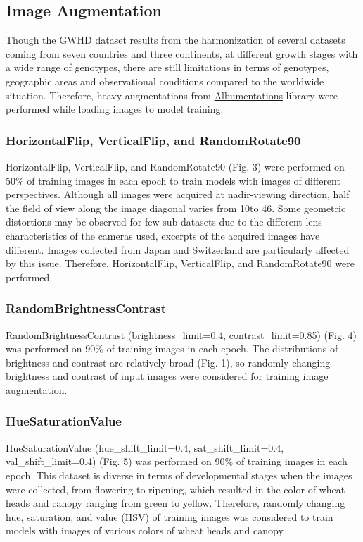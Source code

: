 \documentclass[utf8]{frontiersSCNS} %
\begin{document}
\subsection{Image Augmentation}
Though the GWHD dataset results from the harmonization of several datasets coming from seven countries and three continents, at different growth stages with a wide range of genotypes, there are still limitations in terms of genotypes, geographic areas and observational conditions compared to the worldwide situation. Therefore, heavy augmentations from \href{https://albumentations.ai}{Albumentations} library were performed while loading images to model training.

\subsubsection{HorizontalFlip, VerticalFlip, and RandomRotate90}
HorizontalFlip, VerticalFlip, and RandomRotate90 (Fig. 3) were performed on 50\% of training images in each epoch to train models with images of different perspectives. Although all images were acquired at nadir-viewing direction, half the field of view along the image diagonal varies from 10\degree \space to 46\degree. Some geometric distortions may be observed for few sub-datasets due to the different lens characteristics of the cameras used, excerpts of the acquired images have different. Images collected from Japan and Switzerland are particularly affected by this issue. Therefore, HorizontalFlip, VerticalFlip, and RandomRotate90 were performed.

\subsubsection{RandomBrightnessContrast}
RandomBrightnessContrast (brightness\_limit=0.4, contrast\_limit=0.85) (Fig. 4) was performed on 90\% of training images in each epoch. The distributions of brightness and contrast are relatively broad (Fig. 1), so randomly changing brightness and contrast of input images were considered for training image augmentation.

\subsubsection{HueSaturationValue}
HueSaturationValue (hue\_shift\_limit=0.4, sat\_shift\_limit=0.4, val\_shift\_limit=0.4) (Fig. 5) was performed on 90\% of training images in each epoch. This dataset is diverse in terms of developmental stages when the images were collected, from flowering to ripening, which resulted in the color of wheat heads and canopy ranging from green to yellow. Therefore, randomly changing hue, saturation, and value (HSV) of training images was considered to train models with images of various colors of wheat heads and canopy. 
\end{document}
